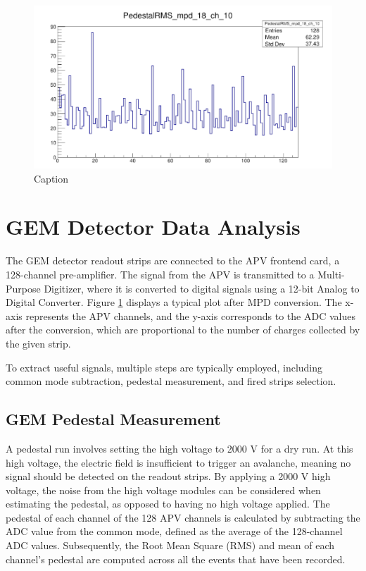 \begin{figure}
    \centering
    \includegraphics[width=\textwidth]{images/chap5/gem_signal.png}
    \caption{Caption}
    \label{fig:apv_25_pedestal_plot}
\end{figure}

\section{GEM Detector Data Analysis}

The GEM detector readout strips are connected to the APV frontend card, a 128-channel pre-amplifier. The signal from the APV is transmitted to a Multi-Purpose Digitizer, where it is converted to digital signals using a 12-bit Analog to Digital Converter. Figure \ref{fig:apv_25_pedestal_plot} displays a typical plot after MPD conversion. The x-axis represents the APV channels, and the y-axis corresponds to the ADC values after the conversion, which are proportional to the number of charges collected by the given strip.

To extract useful signals, multiple steps are typically employed, including common mode subtraction, pedestal measurement, and fired strips selection.

\subsection{GEM Pedestal Measurement}

A pedestal run involves setting the high voltage to 2000 V for a dry run. At this high voltage, the electric field is insufficient to trigger an avalanche, meaning no signal should be detected on the readout strips. By applying a 2000 V high voltage, the noise from the high voltage modules can be considered when estimating the pedestal, as opposed to having no high voltage applied. The pedestal of each channel of the 128 APV channels is calculated by subtracting the ADC value from the common mode, defined as the average of the 128-channel ADC values. Subsequently, the Root Mean Square (RMS) and mean of each channel's pedestal are computed across all the events that have been recorded.


